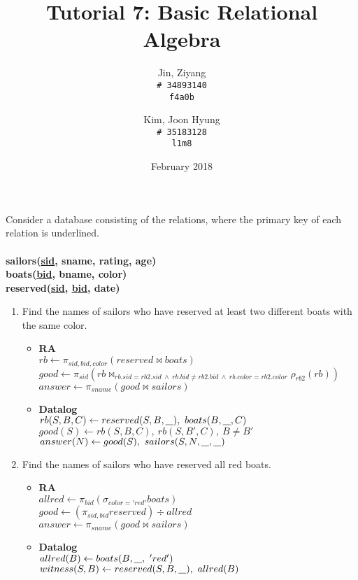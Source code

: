 \documentclass{article}
\title{Tutorial 7: Basic Relational Algebra}
\author{
	Jin, Ziyang\\
	\texttt{\# 34893140}\\
	\texttt{f4a0b}
	\and
	Kim, Joon Hyung\\
	\texttt{\# 35183128}\\
	\texttt{l1m8}
}
\date{February 2018}
\newcommand{\anyvar}{\underline{\hspace{0.8em}}}
\newcommand{\RA}{\textbf{RA}}
\newcommand{\DL}{\textbf{Datalog}}
\begin{document}
	\maketitle

\noindent Consider a database consisting of the relations, where the primary key of each relation is
underlined.\\
\\
\textbf{sailors(\underline{sid}, sname, rating, age)}\\
\textbf{boats(\underline{bid}, bname, color)}\\
\textbf{reserved(\underline{sid}, \underline{bid}, date)}\\

\begin{enumerate}
\item Find the names of sailors who have reserved at least two different boats with the same color.
	\begin{itemize}
	\item \RA\\
	$rb \gets \pi_{sid, bid, color} (reserved \bowtie boats) $\\
	$good \gets \pi_{sid} (rb \bowtie_{rb.sid = rb2.sid\ \land \ rb.bid \neq rb2.bid\ \land \ rb.color = rb2.color} \rho_{rb2}(rb) )$\\
	$answer \gets \pi_{sname} (good \bowtie sailors)$
	\item \DL \\
	$ rb(S, B, C) \gets reserved(S, B, \anyvar ),\ boats(B, \anyvar , C) $\\
	$ good(S) \gets rb(S, B, C),\ rb(S, B', C),\ B \neq B' $\\
	$ answer(N) \gets good(S),\ sailors(S, N, \anyvar, \anyvar)$
	\end{itemize}
\item Find the names of sailors who have reserved all red boats.
	\begin{itemize}
	\item \RA \\
	$ allred \gets \pi_{bid} (\sigma_{color = 'red'} boats)$ \\
	$ good \gets (\pi_{sid, bid} reserved) \div allred $\\
	$ answer \gets \pi_{sname}(good \bowtie sailors)$
	\item \DL \\
	$ allred(B) \gets boats(B, \anyvar,\  'red') $\\
	$ witness(S, B) \gets reserved(S, B, \anyvar),\ allred(B) $ \\

\end{itemize}
\end{enumerate}
\end{document}
